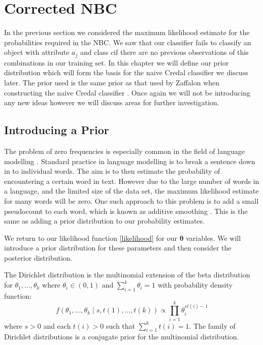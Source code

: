 \chapter{Corrected NBC}

In the previous section we considered the maximum likelihood estimate for the probabilities required in the NBC.
We saw that our classifier fails to classify an object with attribute $a_j$ and class $c$if there are no previous observations of this combinations in our training set.
In this chapter we will define our prior distribution which will form the basis for the naive Credal classifier we discuss later.
The prior used is the same prior as that used by Zaffalon when constructing the naive Credal classifier \cite{Zaffalon01}.
Once again we will not be introducing any new ideas however we will discuss areas for further investigation.

\section{Introducing a Prior}
The problem of zero frequencies is especially common in the field of language modelling \cite{Chen96}.
Standard practice in language modelling is to break a sentence down in to individual words.
The aim is to then estimate the probability of encountering a certain word in text.
However due to the large number of words in a language, and the limited size of the data set, the maximum likelihood estimate for many words will be zero.
One such approach to this problem is to add a small pseudocount to each word, which is known as additive smoothing \cite{Manning08}.
This is the same as adding a prior distribution to our probability estimates.

We return to our likelihood function \cref{likelihood} for our $\mathbf{\theta}$ variables.
We will introduce a prior distribution for these parameters and then consider the posterior distribution.

The Dirichlet distribution is the multinomial extension of the beta distribution for $\theta_1,\dots,\theta_k$ where $\theta_i \in (0,1)$ and $\sum_{i=1}^k \theta_i = 1$ with probability density function:
\begin{equation} \label{dirichlet_pdf}
	f(\theta_1,\dots,\theta_k \mid s, t(1),\dots,t(k)) \propto \prod_{i=1}^k \theta_i^{st(i) - 1}
\end{equation}
where $s > 0$ and each $t(i)>0$ such that $\sum_{i=1}^{k}t(i) = 1$.
The family of Dirichlet distributions is a conjugate prior for the multinomial distribution.


